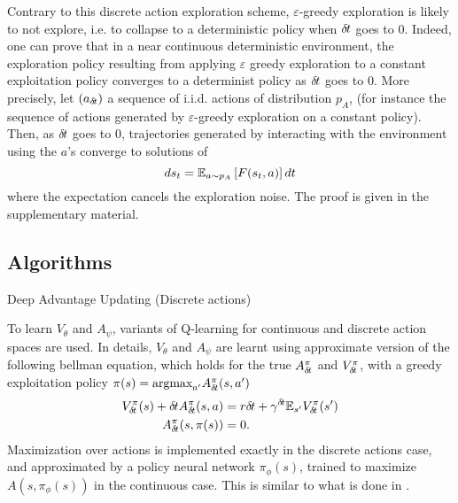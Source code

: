Contrary to this discrete action exploration scheme, $\varepsilon$-greedy
exploration is likely to not explore, i.e. to collapse to a deterministic
policy when ${\delta\hspace{-.1em}t}$ goes to $0$. Indeed, one can prove that in a near
continuous deterministic environment, the exploration policy resulting from
applying $\varepsilon$ greedy exploration to a constant exploitation policy
converges to a determinist policy as ${\delta\hspace{-.1em}t}$ goes to $0$. More precisely, let
$(a_{\delta\hspace{-.1em}t})$ a sequence of i.i.d. actions of distribution $p_A$, (for instance
the sequence of actions generated by $\varepsilon$-greedy exploration on a
constant policy). Then, as ${\delta\hspace{-.1em}t}$ goes to $0$, trajectories generated by
interacting with the environment using the $a$'s converge to solutions of
\begin{equation}
	ds_t = \mathbb{E}_{a\sim p_A}\left[F(s_t, a)\right]dt
\end{equation}
where the expectation cancels the exploration noise. The proof is given in the
supplementary material.

\subsection{Algorithms}
\label{subsec:algorithm}
\begin{algorithm}[ht]
	\caption{Deep Advantage Updating (Discrete actions)}
	
	\label{alg:dau}
\end{algorithm}

To learn $V_{\theta}$ and $A_{\psi}$, variants of Q-learning for continuous and
discrete action spaces are used. In details, $V_{\theta}$ and $A_{\psi}$ are learnt
using approximate version of the following bellman equation, which holds for the true $A^\pi_{\delta\hspace{-.1em}t}$
and $V^\pi_{\delta\hspace{-.1em}t}$, with a greedy exploitation policy $\pi(s) = \text{argmax}_{a'}A^\pi_{\delta\hspace{-.1em}t}(s, a')$
\begin{align}
	V^{\pi}_{\delta\hspace{-.1em}t}(s) + {\delta\hspace{-.1em}t} A^{\pi}_{\delta\hspace{-.1em}t}(s, a) &= r{\delta\hspace{-.1em}t} + \gamma^{{\delta\hspace{-.1em}t}}  \mathbb{E}_{s'} V^{\pi}_{\delta\hspace{-.1em}t}(s')\label{eq:bellman_A}\\
	A^{\pi}_{\delta\hspace{-.1em}t}(s, \pi(s)) &= 0\label{eq:max_A}.
\end{align}
Maximization over actions is implemented exactly in the discrete actions case,
and approximated by a policy neural network $\pi_\phi(s)$, trained to maximize $A(s,
\pi_\phi(s))$ in the continuous case.  This is similar to what is done in
\cite{ddpg}.

